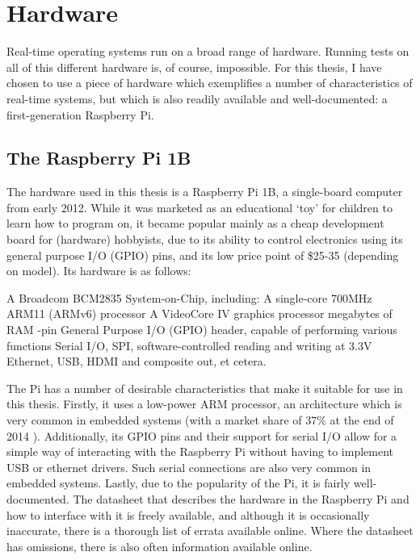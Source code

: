 \documentclass[twoside]{uva-inf-bachelor-thesis}
\begin{document}

%
%
%
%

\chapter{Hardware} \label{chp:hardware}
Real-time operating systems run on a broad range of hardware. Running tests on all of this different hardware is, of course, impossible. For this thesis, I have chosen to use a piece of hardware which exemplifies a number of characteristics of real-time systems, but which is also readily available and well-documented: a first-generation Raspberry Pi.

\section{The Raspberry Pi 1B}
The hardware used in this thesis is a Raspberry Pi 1B, a single-board computer from early 2012. While it was marketed as an educational `toy' for children to learn how to program on, it became popular mainly as a cheap development board for (hardware) hobbyists, due to its ability to control electronics using its general purpose I/O (GPIO) pins, and its low price point of \$25-35 (depending on model). Its hardware is as follows:

\begin{outline}
    \1 A Broadcom BCM2835 System-on-Chip, including:
        \2 A single-core 700MHz ARM11 (ARMv6) processor
        \2 A VideoCore IV graphics processor
         megabytes of RAM
    -pin General Purpose I/O (GPIO) header, capable of performing various functions
        \2 Serial I/O, SPI, software-controlled reading and writing at 3.3V
    \1 Ethernet, USB, HDMI and composite out, et cetera.
\end{outline}

The Pi has a number of desirable characteristics that make it suitable for use in this thesis. Firstly, it uses a low-power ARM processor, an architecture which is very common in embedded systems (with a market share of 37\% at the end of 2014 \cite{arm:embeddedmarketshare}). Additionally, its GPIO pins and their support for serial I/O allow for a simple way of interacting with the Raspberry Pi without having to implement USB or ethernet drivers. Such serial connections are also very common in embedded systems. Lastly, due to the popularity of the Pi, it is fairly well-documented. The datasheet that describes the hardware in the Raspberry Pi and how to interface with it is freely available\cite{bcm:2835peripherals}, and although it is occasionally inaccurate, there is a thorough list of errata available online\cite{bcm:2835errata}. Where the datasheet has omissions, there is also often information available online.
\end{document}
